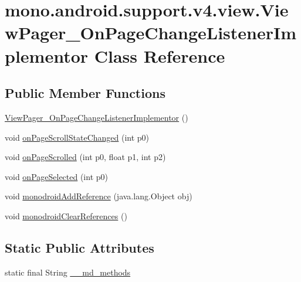 \hypertarget{classmono_1_1android_1_1support_1_1v4_1_1view_1_1_view_pager___on_page_change_listener_implementor}{
\section{mono.android.support.v4.view.ViewPager\_\-OnPageChangeListenerImplementor Class Reference}
\label{classmono_1_1android_1_1support_1_1v4_1_1view_1_1_view_pager___on_page_change_listener_implementor}
}
\subsection*{Public Member Functions}
\begin{CompactItemize}
\item 
\hyperlink{classmono_1_1android_1_1support_1_1v4_1_1view_1_1_view_pager___on_page_change_listener_implementor_7a8615d2cceff2d041d06ca945f4d712}{ViewPager\_\-OnPageChangeListenerImplementor} ()
\item 
void \hyperlink{classmono_1_1android_1_1support_1_1v4_1_1view_1_1_view_pager___on_page_change_listener_implementor_02e554ea766868bfd76878d838994d5f}{onPageScrollStateChanged} (int p0)
\item 
void \hyperlink{classmono_1_1android_1_1support_1_1v4_1_1view_1_1_view_pager___on_page_change_listener_implementor_0c677384a013e2df856b45b6d83e0db6}{onPageScrolled} (int p0, float p1, int p2)
\item 
void \hyperlink{classmono_1_1android_1_1support_1_1v4_1_1view_1_1_view_pager___on_page_change_listener_implementor_caacca2c239f05cf90bf740e2a6707ec}{onPageSelected} (int p0)
\item 
void \hyperlink{classmono_1_1android_1_1support_1_1v4_1_1view_1_1_view_pager___on_page_change_listener_implementor_1764e9eb5a260e6463f4257d572f0dbf}{monodroidAddReference} (java.lang.Object obj)
\item 
void \hyperlink{classmono_1_1android_1_1support_1_1v4_1_1view_1_1_view_pager___on_page_change_listener_implementor_d6e42f49a1f05cca8f7bdd484b17a552}{monodroidClearReferences} ()
\end{CompactItemize}
\subsection*{Static Public Attributes}
\begin{CompactItemize}
\item 
static final String \hyperlink{classmono_1_1android_1_1support_1_1v4_1_1view_1_1_view_pager___on_page_change_listener_implementor_5133c757511dd09339d00fbc794ef33a}{\_\-\_\-md\_\-methods}
\end{CompactItemize}
